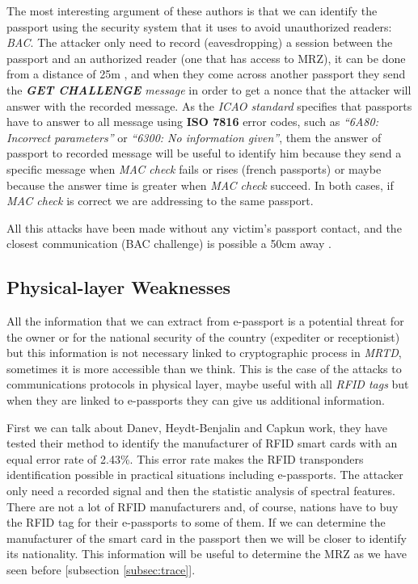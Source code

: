 \documentclass{acm_proc_article-sp}
\begin{document}
The most interesting argument of these authors \cite{CHTOM2010} is that we can identify the passport using the 
security system that it uses to avoid unauthorized readers: \textit{BAC}. The attacker only need to record 
(eavesdropping) a session between the passport and an authorized reader (one that has access to MRZ), 
it can be done from a distance of 25m \cite{02COPA}, and when they come across another passport they send 
the \textit{\textbf{GET CHALLENGE} message} in order to get a nonce that the attacker will answer with the recorded message. 
As the \textit{ICAO standard} specifies that passports have to answer to all message using \textbf{ISO 7816} error codes, 
such as \textit{``6A80: Incorrect parameters''} or \textit{``6300: No information given''}, them the answer of passport to 
recorded message will be useful to identify him because they send a specific message when \textit{MAC check} 
fails or rises  (french passports) or maybe because the answer time is greater when \textit{MAC check} succeed. 
In both cases, if \textit{MAC check} is correct we are addressing to the same passport.

All this attacks have been made without any victim’s passport contact, and the closest communication 
(BAC challenge) is possible a 50cm away \cite{CHTOM2010}.

\subsection{Physical-layer Weaknesses}
\label{subsec:phy}
All the information that we can extract from e-passport is a potential threat for the owner or for 
the national security of the country (expediter or receptionist) but this information is not necessary 
linked to cryptographic process in \textit{MRTD}, sometimes it is more accessible than we think. This is the 
case of the attacks to communications protocols in physical layer, maybe useful with all \textit{RFID tags} 
but when they are linked to e-passports they can give us additional information.

First we can talk about Danev, Heydt-Benjalin and Capkun \cite{05DABO2009} work, they have tested their method 
to identify the manufacturer of RFID smart cards with an equal error rate of 2.43\%. This error rate 
makes the RFID transponders identification possible in practical situations including e-passports. 
The attacker only need a recorded signal and then the statistic analysis of spectral features. 
There are not a lot of RFID manufacturers and, of course, nations have to buy the RFID tag for their 
e-passports to some of them. If we can determine the manufacturer of the smart card in the passport 
then we will be closer to identify its nationality. This information will be useful to determine the 
MRZ as we have seen before [subsection \ref{subsec:trace}].
\end{document}
